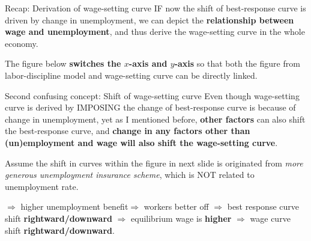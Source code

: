 \documentclass{beamer}
\begin{document}
\begin{frame}{Recap: Derivation of wage-setting curve}
\label{slide:Recap__Derivation_of_wage_setting_curve}
    IF now the shift of best-response curve is driven by change in unemployment, we can depict the \textbf{relationship between wage and unemployment}, and thus derive the wage-setting curve in the whole economy.

    The figure below \textbf{switches the $ x $-axis and $ y $-axis} so that both the figure from labor-discipline model and wage-setting curve can be directly linked.

\end{frame}


\begin{frame}
\end{frame}

\begin{frame}{Second confusing concept: Shift of wage-setting curve}
\label{slide:Second_confusing_concept__Shift_of_wage_setting_curve}
    Even though wage-setting curve is derived by IMPOSING the change of best-response curve is because of change in unemployment, yet as I mentioned before, \textbf{other factors} can also shift the best-response curve, and \textbf{change in any factors other than (un)employment and wage will also shift the wage-setting curve}.

    Assume the shift in curves within the figure in next slide is originated from \textit{more generous unemployment insurance scheme}, which is NOT related to unemployment rate.

    $ \Rightarrow  $ higher unemployment benefit$ \Rightarrow  $ workers better off $ \Rightarrow  $ best response curve shift \textbf{rightward/downward} $ \Rightarrow  $ equilibrium wage is \textbf{higher} $ \Rightarrow  $ wage curve shift \textbf{rightward/downward}.

\end{frame}
\end{document}
